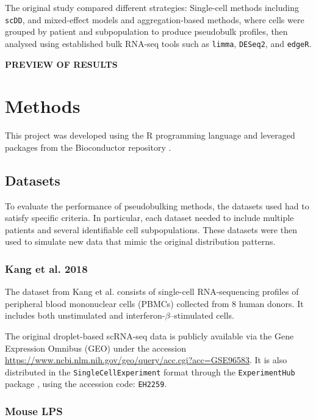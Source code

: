 \documentclass[a4paper, 11pt, twocolumn]{article}
\begin{document}
The original study compared different strategies: Single-cell methods including \texttt{scDD}, and mixed-effect models and aggregation-based methods, where cells were grouped by patient and subpopulation to produce pseudobulk profiles, then analysed using established bulk RNA-seq tools such as \texttt{limma}, \texttt{DESeq2}, and \texttt{edgeR}. 

\textbf{PREVIEW OF RESULTS}

\section{Methods}

This project was developed using the R programming language \citep{base} and leveraged packages from the Bioconductor repository \citep{bioc}.

\subsection{Datasets}

To evaluate the performance of pseudobulking methods, the datasets used had to satisfy specific criteria. In particular, each dataset needed to include multiple patients and several identifiable cell subpopulations. These datasets were then used to simulate new data that mimic the original distribution patterns.

\subsubsection{Kang et al. 2018}

The dataset from Kang et al. \citep{kang_multiplexed_2018} consists of single-cell RNA-sequencing profiles of peripheral blood mononuclear cells (PBMCs) collected from 8 human donors. It includes both unstimulated and interferon-$\beta$–stimulated cells.

The original droplet-based scRNA-seq data is publicly available via the Gene Expression Omnibus (GEO) under the accession \url{https://www.ncbi.nlm.nih.gov/geo/query/acc.cgi?acc=GSE96583}. It is also distributed in the \texttt{SingleCellExperiment} format \citep{sce} through the \texttt{ExperimentHub} package \citep{ExperimentHub}, using the accession code: \texttt{EH2259}.

\subsubsection{Mouse LPS}
\end{document}
